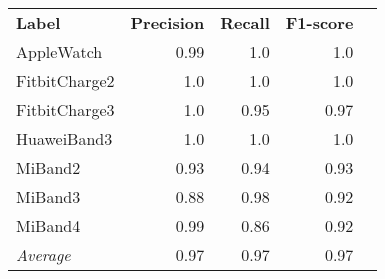 \begin{tabular}{lrrrr}
    \textbf{Label} & \textbf{Precision} & \textbf{Recall} & \textbf{F1-score} \\
    AppleWatch & 0.99 & 1.0 & 1.0 \\
    FitbitCharge2 & 1.0 & 1.0 & 1.0 \\
    FitbitCharge3 & 1.0 & 0.95 & 0.97 \\
    HuaweiBand3 & 1.0 & 1.0 & 1.0 \\
    MiBand2 & 0.93 & 0.94 & 0.93 \\
    MiBand3 & 0.88 & 0.98 & 0.92 \\
    MiBand4 & 0.99 & 0.86 & 0.92 \\
    \emph{Average} & 0.97 & 0.97 & 0.97 \\
\end{tabular}